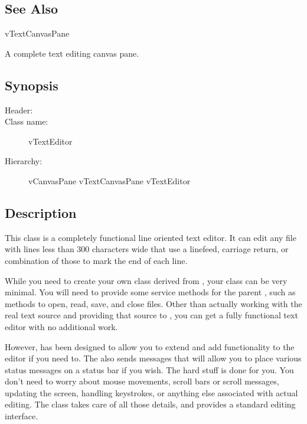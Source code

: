 \subsection* {See Also}

vTextCanvasPane


A complete text editing canvas pane.

\subsection* {Synopsis}

\begin{description}
	\item [Header:] 
	\item [Class name:] vTextEditor
 	\item [Hierarchy:] vCanvasPane \rta vTextCanvasPane \rta vTextEditor
\end{description}

\subsection* {Description}

This class is a completely functional line oriented text editor.
It can edit any file with lines less than 300 characters wide that
use a linefeed, carriage return, or combination of those to mark
the end of each line.

While you need to create your own class derived from ,
your class can be very minimal. You will need to provide some
service methods for the parent , such as methods
to open, read, save, and close files. Other than actually working
with the real text source and providing that source to ,
you can get a fully functional text editor with no additional work.

However,  has been designed to allow you to extend
and add functionality to the editor if you need to. The 
also sends messages that will allow you to place various status
messages on a status bar if you wish. The hard stuff is done for you.
You don't need to worry about mouse movements, scroll bars or scroll
messages, updating the screen, handling keystrokes, or anything else
associated with actual editing. The  class takes
care of all those details, and provides a standard editing interface.

